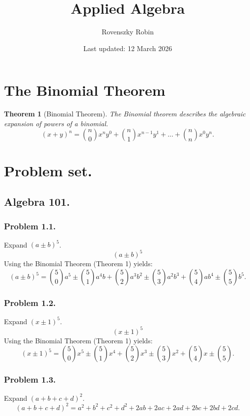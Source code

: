 \documentclass{article}
\title{Applied Algebra}
\author{Rovenszky Robin}
\date{Last updated: 12 March 2026}
\newtheorem{theorem}{Theorem}
\begin{document}
\maketitle

\section{The Binomial Theorem}
\begin{theorem}[Binomial Theorem]
The Binomial theorem describes the algebraic expansion of powers of a binomial.
\begin{equation}
    (x+y)^n = \binom{n}{0}x^ny^0 + \binom{n}{1}x^{n-1}y^1 + ... + \binom{n}{n}x^0y^n.
\end{equation}
\end{theorem}

\section{Problem set.}
\subsection{Algebra 101.}
\subsubsection{Problem 1.1.}
Expand $(a\pm b)^5$.
\begin{equation}
    (a \pm b)^5
\end{equation}
Using the Binomial Theorem (Theorem 1) yields:
\begin{equation}
    (a \pm b)^5 = \binom{5}{0}a^5 \pm \binom{5}{1}a^4b + \binom{5}{2}a^3b^2 \pm \binom{5}{3}a^2b^3 + \binom{5}{4}ab^4 \pm \binom{5}{5}b^5.
\end{equation}

\subsubsection{Problem 1.2.}
Expand $(x\pm 1)^5$.
\begin{equation}
    (x \pm 1)^5
\end{equation}
Using the Binomial Theorem (Theorem 1) yields:
\begin{equation}
    (x \pm 1)^5 = \binom{5}{0}x^5\pm \binom{5}{1}x^4 + \binom{5}{2}x^3 \pm \binom{5}{3}x^2 + \binom{5}{4}x \pm \binom{5}{5}.
\end{equation}

\subsubsection{Problem 1.3.}
Expand $(a+b+c+d)^2$.
\begin{equation}
    (a+b+c+d)^2 = a^2 + b^2 + c^2 + d^2 + 2ab + 2ac + 2ad + 2bc + 2bd + 2cd.
\end{equation}
\end{document}
